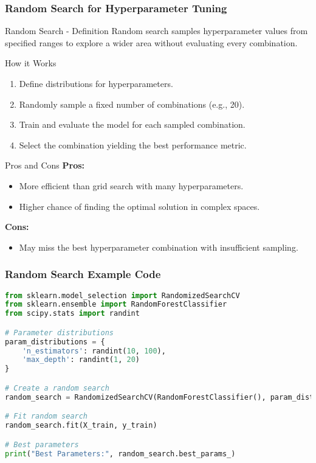 \documentclass[aspectratio=169]{beamer}
\begin{document}
\begin{frame}[fragile]
    \frametitle{Random Search for Hyperparameter Tuning}
    \begin{block}{Random Search - Definition}
        Random search samples hyperparameter values from specified ranges to explore a wider area without evaluating every combination.
    \end{block}
    
    \begin{block}{How it Works}
        \begin{enumerate}
            \item Define distributions for hyperparameters.
            \item Randomly sample a fixed number of combinations (e.g., 20).
            \item Train and evaluate the model for each sampled combination.
            \item Select the combination yielding the best performance metric.
        \end{enumerate}
    \end{block}
    
    \begin{block}{Pros and Cons}
        \textbf{Pros:}
        \begin{itemize}
            \item More efficient than grid search with many hyperparameters.
            \item Higher chance of finding the optimal solution in complex spaces.
        \end{itemize}
        \textbf{Cons:}
        \begin{itemize}
            \item May miss the best hyperparameter combination with insufficient sampling.
        \end{itemize}
    \end{block}
\end{frame}

\begin{frame}[fragile]
    \frametitle{Random Search Example Code}
    \begin{lstlisting}[language=Python]
from sklearn.model_selection import RandomizedSearchCV
from sklearn.ensemble import RandomForestClassifier
from scipy.stats import randint

# Parameter distributions
param_distributions = {
    'n_estimators': randint(10, 100),
    'max_depth': randint(1, 20)
}

# Create a random search
random_search = RandomizedSearchCV(RandomForestClassifier(), param_distributions, n_iter=20, cv=5)

# Fit random search
random_search.fit(X_train, y_train)

# Best parameters
print("Best Parameters:", random_search.best_params_)
    \end{lstlisting}
\end{frame}
\end{document}
